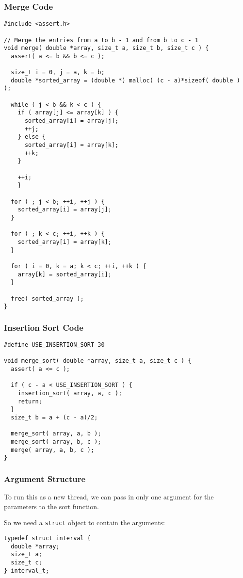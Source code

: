 \begin{frame}[fragile]
\frametitle{Merge Code}

{\tiny
\begin{verbatim}
#include <assert.h>

// Merge the entries from a to b - 1 and from b to c - 1 
void merge( double *array, size_t a, size_t b, size_t c ) {
  assert( a <= b && b <= c );
  
  size_t i = 0, j = a, k = b;
  double *sorted_array = (double *) malloc( (c - a)*sizeof( double ) );
  
  while ( j < b && k < c ) {
    if ( array[j] <= array[k] ) {
      sorted_array[i] = array[j];
      ++j; 
    } else {
      sorted_array[i] = array[k];
      ++k; 
    }
    
    ++i; 
    }
    
  for ( ; j < b; ++i, ++j ) {
    sorted_array[i] = array[j];
  }
    
  for ( ; k < c; ++i, ++k ) {
    sorted_array[i] = array[k];
  }
    
  for ( i = 0, k = a; k < c; ++i, ++k ) {
    array[k] = sorted_array[i];
  }
    
  free( sorted_array );
}
\end{verbatim}
}


\end{frame}
 
\begin{frame}[fragile]
\frametitle{Insertion Sort Code}


\begin{verbatim}
#define USE_INSERTION_SORT 30

void merge_sort( double *array, size_t a, size_t c ) {
  assert( a <= c );
  
  if ( c - a < USE_INSERTION_SORT ) {
    insertion_sort( array, a, c );
    return;
  }
  size_t b = a + (c - a)/2;
  
  merge_sort( array, a, b );
  merge_sort( array, b, c );
  merge( array, a, b, c );
}
\end{verbatim}

\end{frame}

\begin{frame}[fragile]
\frametitle{Argument Structure}


To run this as a new thread, we can pass in only one argument for the parameters to the sort function. 

So we need a \texttt{struct} object to contain the arguments:

\begin{verbatim}
typedef struct interval {
  double *array;
  size_t a;
  size_t c;
} interval_t;
\end{verbatim}


\end{frame}

